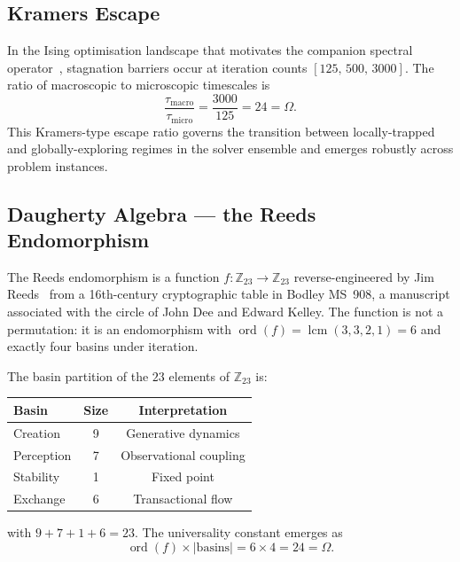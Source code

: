 \documentclass[11pt,a4paper]{article}
\theoremstyle{plain}
\theoremstyle{remark}
\renewcommand{\Omega}{\varOmega}
\newcommand{\Z}{\mathbb{Z}}
\newcommand{\abs}[1]{\lvert #1 \rvert}
\newcommand{\ord}{\operatorname{ord}}
\newcommand{\lcmop}{\operatorname{lcm}}
\begin{document}
\subsection{Kramers Escape}
\label{sec:path-kramers}

In the Ising optimisation landscape that motivates the companion spectral
operator~\cite{DHR2026a}, stagnation barriers occur at iteration counts
$[125,\, 500,\, 3000]$.  The ratio of macroscopic to microscopic timescales
is
\[
  \frac{\tau_{\mathrm{macro}}}{\tau_{\mathrm{micro}}}
  = \frac{3000}{125} = 24 = \Omega.
\]
This Kramers-type escape ratio governs the transition between
locally-trapped and globally-exploring regimes in the solver ensemble
and emerges robustly across problem instances.

\subsection{Daugherty Algebra --- the Reeds Endomorphism}
\label{sec:path-reeds}

The Reeds endomorphism is a function $f\colon\Z_{23}\to\Z_{23}$
reverse-engineered by Jim Reeds~\cite{reeds2006} from a 16th-century
cryptographic table in Bodley MS~908, a manuscript associated with the
circle of John Dee and Edward Kelley.
The function is not a permutation: it is an endomorphism with
$\ord(f)=\lcmop(3,3,2,1)=6$ and exactly four basins under iteration.

The basin partition of the $23$ elements of $\Z_{23}$ is:
\begin{center}
\begin{tabular}{lcc}
\toprule
\textbf{Basin} & \textbf{Size} & \textbf{Interpretation} \\
\midrule
Creation    & 9 & Generative dynamics \\
Perception  & 7 & Observational coupling \\
Stability   & 1 & Fixed point \\
Exchange    & 6 & Transactional flow \\
\bottomrule
\end{tabular}
\end{center}
with $9+7+1+6=23$.  The universality constant emerges as
\[
  \ord(f)\times\abs{\text{basins}} = 6\times 4 = 24 = \Omega.
\]
\end{document}
